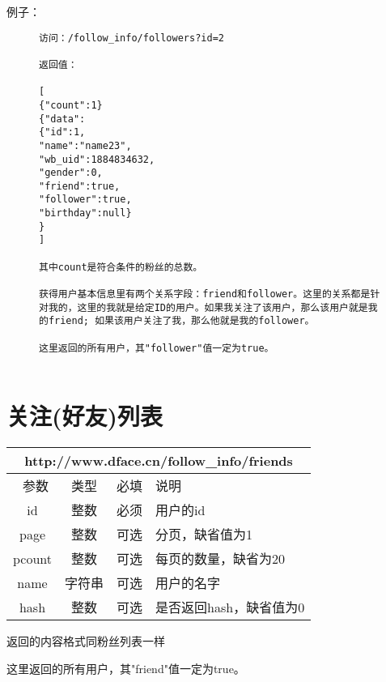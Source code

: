 \documentclass[cs4size]{ctexartutf8}
\begin{document}
例子：

\begin{figure}[H]
\begin{verbatim}
访问：/follow_info/followers?id=2

返回值：

[
{"count":1}
{"data":
{"id":1,
"name":"name23",
"wb_uid":1884834632,
"gender":0,
"friend":true,
"follower":true,
"birthday":null}
}
]

其中count是符合条件的粉丝的总数。

获得用户基本信息里有两个关系字段：friend和follower。这里的关系都是针对我的，这里的我就是给定ID的用户。如果我关注了该用户，那么该用户就是我的friend; 如果该用户关注了我，那么他就是我的follower。

这里返回的所有用户，其"follower"值一定为true。


\end{verbatim}
\end{figure}





\section{关注(好友)列表}

\begin{table}[H]
   \begin{center}
\begin{tabular}{|c|c|c|p{12cm}|}
\hline
\multicolumn{4}{|c|}{http://www.dface.cn/follow\_info/friends} \\
\hline\hline
 \  参数  & 类型 & 必填 &  说明  \\
\hline
 id  & 整数 & 必须 &  用户的id\\
   \hline
 page  & 整数 & 可选 & 分页，缺省值为1\\ 
 \hline
 pcount  & 整数 & 可选 & 每页的数量，缺省为20\\ 
     \hline
 name  & 字符串 & 可选 & 用户的名字\\ 
     \hline
 hash  & 整数 & 可选 & 是否返回hash，缺省值为0\\ 
\hline

\end{tabular}
   \end{center}
\end{table}

返回的内容格式同粉丝列表一样

这里返回的所有用户，其"friend"值一定为true。
\end{document}
